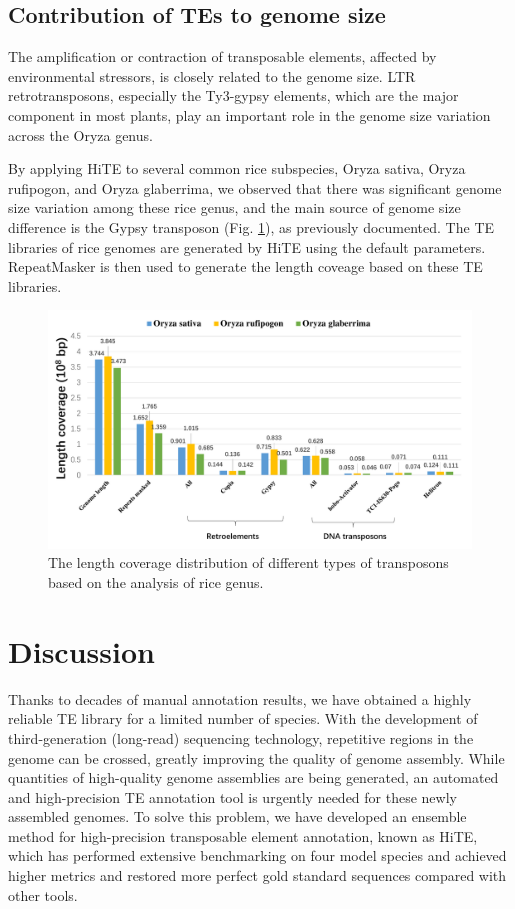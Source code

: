 \documentclass{bmcart}
\begin{document}
\subsection*{Contribution of TEs to genome size}
The amplification or contraction of transposable elements, affected by environmental stressors, is closely related to the genome size\cite{canapa2015transposons, zhang2019landscape}. LTR retrotransposons, especially the Ty3-gypsy elements, which are the major component in most plants, play an important role in the genome size variation across the Oryza genus\cite{ zuccolo2007transposable}.

By applying HiTE to several common rice subspecies, Oryza sativa, Oryza rufipogon, and Oryza glaberrima, we observed that there was significant genome size variation among these rice genus, and the main source of genome size difference is the Gypsy transposon (Fig. \ref{fig:rice_diff}), as previously documented. The TE libraries of rice genomes are generated by HiTE using the default parameters. RepeatMasker is then used to generate the length coveage based on these TE libraries. 

\begin{figure}[h!]
	\centerline{\includegraphics[width=1.0\textwidth]{figures/RiceDiff.pdf}}
	\caption{The length coverage distribution of different types of transposons based on the analysis of rice genus.}
	\label{fig:rice_diff}
\end{figure}


\section*{Discussion}
Thanks to decades of manual annotation results, we have obtained a highly reliable TE library for a limited number of species. With the development of third-generation (long-read) sequencing technology, repetitive regions in the genome can be crossed, greatly improving the quality of genome assembly. While quantities of high-quality genome assemblies are being generated, an automated and high-precision TE annotation tool is urgently needed for these newly assembled genomes. To solve this problem, we have developed an ensemble method for high-precision transposable element annotation, known as HiTE, which has performed extensive benchmarking on four model species and achieved higher metrics and restored more perfect gold standard sequences compared with other tools.
\end{document}

